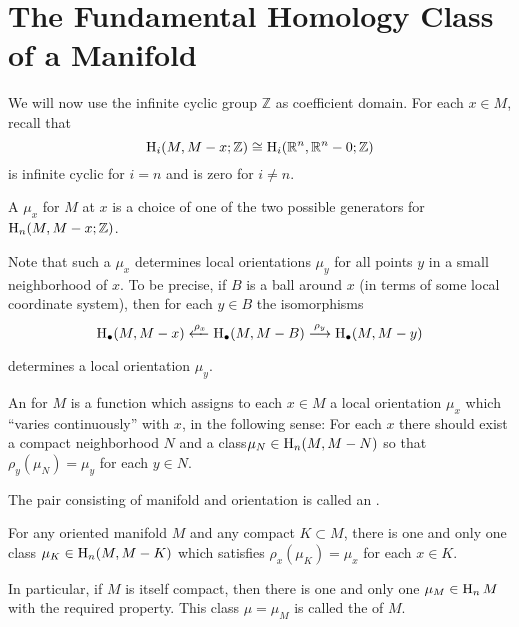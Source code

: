 \documentclass[../main]{subfiles}
\begin{document}
\section{The Fundamental Homology Class of a Manifold}
We will now use the infinite cyclic group $\mathbb Z$ as coefficient domain. For each $x \in M$, recall that \[\operatorname{H}_i(M, M - x; \mathbb Z) \cong \operatorname{H}_i({\mathbb R}^n, {\mathbb R}^n - 0; \mathbb Z)\] is infinite cyclic for $i = n$ and is zero for $i \ne n$. 

\begin{definition}
A  $\mu_x$ for $M$ at $x$ is a choice of one of the two possible generators for $\operatorname{H}_n(M, M - x; \mathbb Z)$. 
\end{definition}

Note that such a $\mu_x$ determines local orientations $\mu_y$ for all points $y$ in a small neighborhood of $x$. To be precise, if $B$ is a ball around $x$ (in terms of some local coordinate system), then for each $y \in B$ the isomorphisms \[\homology_\bullet(M, M - x) \xleftarrow{\rho_x} \homology_\bullet(M, M - B) \varrightarrow{\rho_y} \homology_\bullet(M, M - y)\] determines a local orientation $\mu_y$. 

\begin{definition}
An  for $M$ is a function which assigns to each $x \in M$ a local orientation $\mu_x$ which ``varies continuously'' with $x$, in the following sense: For each $x$ there should exist a compact neighborhood $N$ and a class\newline $\mu_N \in \operatorname{H}_n(M, M - N)$ so that $\rho_y(\mu_N) = \mu_y$ for each $y \in N$.
\end{definition}

The pair consisting of manifold and orientation is called an .

\begin{theorem}
\label{thm:A.8}
For any oriented manifold $M$ and any compact $K \subset M$, there is one and only one class $\mu_K \in \operatorname{H}_n(M, M - K)$ which satisfies $\rho_x(\mu_K) = \mu_x$ for each $x \in K$. 
\end{theorem}

In particular, if $M$ is itself compact, then there is one and only one $\mu_M \in \operatorname{H}_n M$ with the required property. This class $\mu = \mu_M$ is called the  of $M$. 
\end{document}
